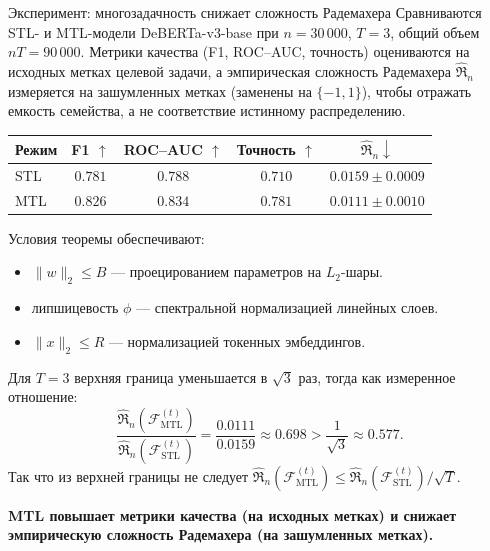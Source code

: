 \documentclass[9pt,pdf,hyperref={unicode}]{beamer}
\newcommand{\key}[1]{\par\vspace{0.5ex}\noindent\textbf{\color{darkgreen}#1}}
\begin{document}
\begin{frame}{Эксперимент: многозадачность снижает сложность Радемахера}
\justifying
\footnotesize
Сравниваются STL- и MTL-модели DeBERTa-v3-base при $n=30\,000$, $T=3$, общий объем $nT=90\,000$. Метрики качества (F1, ROC--AUC, точность) оцениваются на исходных метках целевой задачи, а эмпирическая сложность Радемахера $\widehat{\mathfrak R}_n$ измеряется на зашумленных метках (заменены на $\{-1,1\}$), чтобы отражать емкость семейства, а не соответствие истинному распределению.
\begin{center}
{\scriptsize
\begin{tabular}{@{}lcccc@{}}
\hline
Режим & F1 $\uparrow$ & ROC--AUC $\uparrow$ & Точность $\uparrow$ & $\widehat{\mathfrak R}_n\downarrow$ \\
\hline
STL & $0.781$ & $0.788$ & $0.710$ & $0.0159\pm0.0009$ \\
\hline
MTL & $\mathbf{0.826}$ & $\mathbf{0.834}$ & $\mathbf{0.781}$ & $\mathbf{0.0111}\pm\mathbf{0.0010}$ \\
\hline
\end{tabular}}
\end{center}
\smallskip
Условия теоремы обеспечивают:
\begin{itemize}
    \item $\|w\|_2\le B$ --- проецированием параметров на $L_2$-шары.
    \item липшицевость $\phi$ --- спектральной нормализацией линейных слоев.
    \item $\|x\|_2\le R$ --- нормализацией токенных эмбеддингов.
\end{itemize}
\smallskip
Для $T=3$ верхняя граница уменьшается в $\sqrt{3}$ раз, тогда как измеренное отношение:
\[
    \frac{\widehat{\mathfrak R}_n(\mathcal{F}_{\mathrm{MTL}}^{(t)})}{\widehat{\mathfrak R}_n(\mathcal{F}_{\mathrm{STL}}^{(t)})}=\frac{0.0111}{0.0159}\approx0.698>\frac{1}{\sqrt{3}}\approx0.577.
\]
Так что из верхней границы не следует $\widehat{\mathfrak R}_n(\mathcal{F}_{\mathrm{MTL}}^{(t)})\le\widehat{\mathfrak R}_n(\mathcal{F}_{\mathrm{STL}}^{(t)})/\sqrt{T}$.
\key{MTL повышает метрики качества (на исходных метках) и снижает эмпирическую сложность Радемахера (на зашумленных метках).}
\end{frame}

\end{document}
